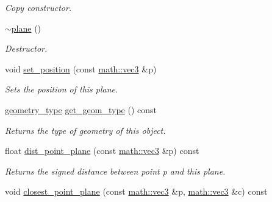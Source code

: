 \begin{DoxyCompactItemize}
\begin{DoxyCompactList}\small\item\em Copy constructor. \end{DoxyCompactList}\item 
\mbox{\label{classphysim_1_1geometric_1_1plane_a831003b81a0242d23575a1de6c4745bf}} 
\hyperlink{classphysim_1_1geometric_1_1plane_a831003b81a0242d23575a1de6c4745bf}{$\sim$plane} ()
\begin{DoxyCompactList}\small\item\em Destructor. \end{DoxyCompactList}\item 
void \hyperlink{classphysim_1_1geometric_1_1plane_a201455ce1b4493b02b2f0c14e7d57e71}{set\+\_\+position} (const \hyperlink{structphysim_1_1math_1_1vec3}{math\+::vec3} \&p)
\begin{DoxyCompactList}\small\item\em Sets the position of this plane. \end{DoxyCompactList}\item 
\mbox{\label{classphysim_1_1geometric_1_1plane_a857294ae1706c7cfd33cb5b5614b3ac8}} 
\hyperlink{namespacephysim_1_1geometric_ac2794fff270c5b2ff4307f107a365fca}{geometry\+\_\+type} \hyperlink{classphysim_1_1geometric_1_1plane_a857294ae1706c7cfd33cb5b5614b3ac8}{get\+\_\+geom\+\_\+type} () const
\begin{DoxyCompactList}\small\item\em Returns the type of geometry of this object. \end{DoxyCompactList}\item 
float \hyperlink{classphysim_1_1geometric_1_1plane_ac936ee12c58bf474238f76bb1ad64c2c}{dist\+\_\+point\+\_\+plane} (const \hyperlink{structphysim_1_1math_1_1vec3}{math\+::vec3} \&p) const
\begin{DoxyCompactList}\small\item\em Returns the signed distance between point {\itshape p} and this plane. \end{DoxyCompactList}\item 
\mbox{\label{classphysim_1_1geometric_1_1plane_aa734e27be8999129ee2912fc3bb4b0e9}} 
void \hyperlink{classphysim_1_1geometric_1_1plane_aa734e27be8999129ee2912fc3bb4b0e9}{closest\+\_\+point\+\_\+plane} (const \hyperlink{structphysim_1_1math_1_1vec3}{math\+::vec3} \&p, \hyperlink{structphysim_1_1math_1_1vec3}{math\+::vec3} \&c) const

\end{DoxyCompactItemize}

